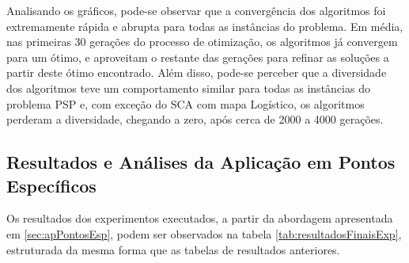 Analisando os gráficos, pode-se observar que a convergência dos algoritmos foi extremamente rápida e abrupta para todas as instâncias do problema. Em média, nas primeiras 30 gerações do processo de otimização, os algoritmos já convergem para um ótimo, e aproveitam o restante das gerações para refinar as soluções a partir deste ótimo encontrado. Além disso, pode-se perceber que a diversidade dos algoritmos teve um comportamento similar para todas as instâncias do problema PSP e, com exceção do SCA com mapa Logístico, os algoritmos perderam a diversidade, chegando a zero, após cerca de 2000 a 4000 gerações.


\subsection{Resultados e Análises da Aplicação em Pontos Específicos}



Os resultados dos experimentos executados, a partir da abordagem apresentada em \ref{sec:apPontosEsp}, podem ser observados na tabela \ref{tab:resultadosFinaisExp}, estruturada da mesma forma que as tabelas de resultados anteriores.

